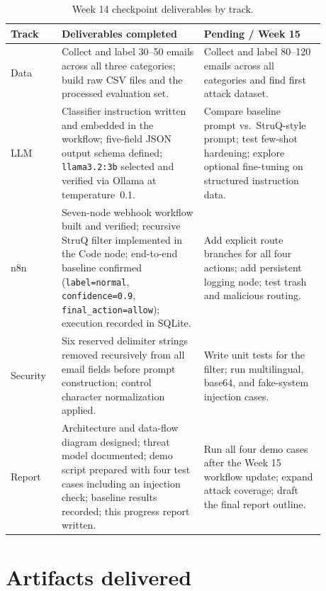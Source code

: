 \documentclass[11pt,a4paper]{article}
\begin{document}
\begin{table}[H]
\centering
\begin{tabular}{p{0.14\linewidth} p{0.40\linewidth} p{0.34\linewidth}}
\toprule
\textbf{Track} & \textbf{Deliverables completed} & \textbf{Pending / Week 15} \\
\midrule
Data &
  Collect and label 30--50 emails across all three categories;
  build raw CSV files and the processed evaluation set. &
  Collect and label 80--120 emails across all categories and find first attack dataset. \\
LLM &
  Classifier instruction written and embedded in the workflow;
  five-field JSON output schema defined;
  \texttt{llama3.2:3b} selected and verified via Ollama at temperature~0.1. &
  Compare baseline prompt vs.\ StruQ-style prompt; test few-shot hardening;
  explore optional fine-tuning on structured instruction data. \\
n8n &
  Seven-node webhook workflow built and verified;
  recursive StruQ filter implemented in the Code node;
  end-to-end baseline confirmed (\texttt{label=normal},
  \texttt{confidence=0.9}, \texttt{final\_action=allow});
  execution recorded in SQLite. &
  Add explicit route branches for all four actions;
  add persistent logging node;
  test trash and malicious routing. \\
Security &
  Six reserved delimiter strings removed recursively from all email fields
  before prompt construction;
  control character normalization applied. &
  Write unit tests for the filter;
  run multilingual, base64, and fake-system injection cases. \\
Report &
  Architecture and data-flow diagram designed;
  threat model documented;
  demo script prepared with four test cases including an injection check;
  baseline results recorded;
  this progress report written. &
  Run all four demo cases after the Week 15 workflow update;
  expand attack coverage;
  draft the final report outline. \\
\bottomrule
\end{tabular}
\caption{Week 14 checkpoint deliverables by track.}
\end{table}

\section{Artifacts delivered}
\end{document}

